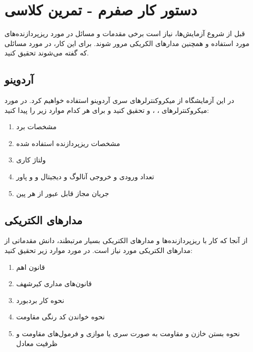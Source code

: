 \section{دستور کار صفرم - تمرین کلاسی}

قبل از شروع آزمایش‌ها، نیاز است برخی مقدمات و مسائل در مورد ریزپردازنده‌های مورد استفاده و همچنین مدارهای الکریکی مرور شوند. برای این کار، در مورد مسائلی که گفته می‌شوند تحقیق کنید.

\subsection{آردوینو}
در این آزمایشگاه از میکروکنترلرهای سری آردوینو استفاده خواهیم کرد. در مورد میکروکنترلر‌های
،
،
 و 
تحقیق کنید و برای هر کدام موارد زیر را پیدا کنید:

\begin{enumerate}
    \item مشخصات برد
    \item مشخصات ریزپردازنده استفاده شده
    \item ولتاژ کاری
    \item تعداد ورودی و خروجی آنالوگ و دیجیتال و  و پاور
    \item جریان مجاز قابل عبور از هر پین
\end{enumerate}

\subsection{مدارهای الکتریکی}

از آنجا که کار با ریزپردازنده‌ها و مدارهای الکتریکی بسیار مرتبطند، دانش مقدماتی از مدارهای الکتریکی مورد نیاز است. در مورد موارد زیر تحقیق کنید:

\begin{enumerate}
    \item قانون اهم
    \item قانون‌های مداری کیرشهف
    \item نحوه کار بردبورد
    \item نحوه خواندن کد رنگی مقاومت
    \item نحوه بستن خازن و مقاومت به صورت سری یا موازی و فرمول‌های مقاومت و ظرفیت معادل
\end{enumerate}